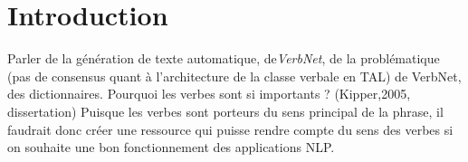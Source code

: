\chapter*{Introduction}
\noindent Parler de la génération de texte automatique, de\emph{VerbNet}, de la problématique (pas de consensus quant à l'architecture de la classe verbale en TAL) de VerbNet, des dictionnaires. Pourquoi les verbes sont si importants ? (Kipper,2005, dissertation) Puisque les verbes sont porteurs du sens principal de la phrase, il faudrait donc créer une ressource qui puisse rendre compte du sens des verbes si on souhaite une bon fonctionnement des applications NLP.



